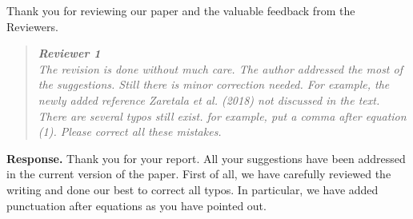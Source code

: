 \documentclass[12pt]{article}
\begin{document}
 Thank you for reviewing our paper and the valuable feedback from the Reviewers.
%
%

\newpage
\begin{quote}
\emph{{\bf Reviewer 1}\\
The revision is done without much care. The author addressed the most of the suggestions. Still there is minor correction needed. For
example, the newly added reference Zaretala et al. (2018) not discussed in the text. There are several typos still exist.  for example, put a comma after equation (1). Please correct all these mistakes.}
\end{quote}

{\bf Response.}
Thank you for your report. All your suggestions have been addressed in the current version of the paper. First of all, we have carefully reviewed the writing and done our best to correct all typos. In particular, we have added punctuation after equations as you have pointed out.      \
\end{document}
